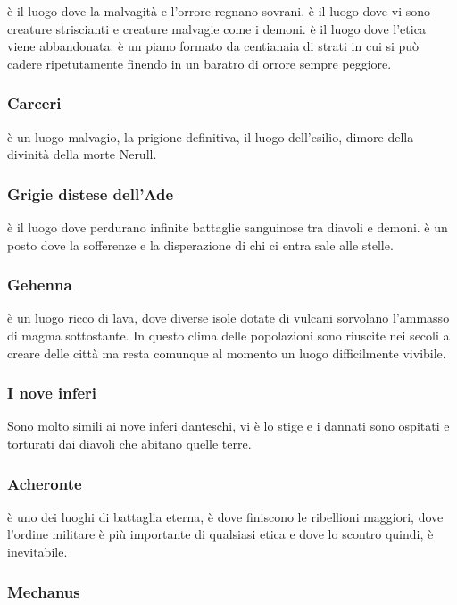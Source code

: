 \documentclass[a4paper,12pt]{book}
\begin{document}
è il luogo dove la malvagità e l'orrore regnano sovrani.
è il luogo dove vi sono creature striscianti e creature malvagie come i demoni.
è il luogo dove l'etica viene abbandonata.
è un piano formato da centianaia di strati in cui si può cadere ripetutamente finendo in un baratro di orrore sempre peggiore.

\subsubsection{Carceri}

è un luogo malvagio, la prigione definitiva, il luogo dell'esilio, dimore della divinità della morte Nerull.

\subsubsection{Grigie distese dell'Ade}

è il luogo dove perdurano infinite battaglie sanguinose tra diavoli e demoni.
è un posto dove la sofferenze e la disperazione di chi ci entra sale alle stelle.

\subsubsection{Gehenna}

è un luogo ricco di lava, dove diverse isole dotate di vulcani sorvolano l'ammasso di magma sottostante.
In questo clima delle popolazioni sono riuscite nei secoli a creare delle città ma resta comunque al momento un luogo difficilmente vivibile.

\subsubsection{I nove inferi}

Sono molto simili ai nove inferi danteschi, vi è lo stige e i dannati sono ospitati e torturati dai diavoli che abitano quelle terre.

\subsubsection{Acheronte}

è uno dei luoghi di battaglia eterna, è dove finiscono le ribellioni maggiori, dove l'ordine militare è più importante di qualsiasi etica e dove lo scontro quindi, è inevitabile.

\subsubsection{Mechanus}
\end{document}
